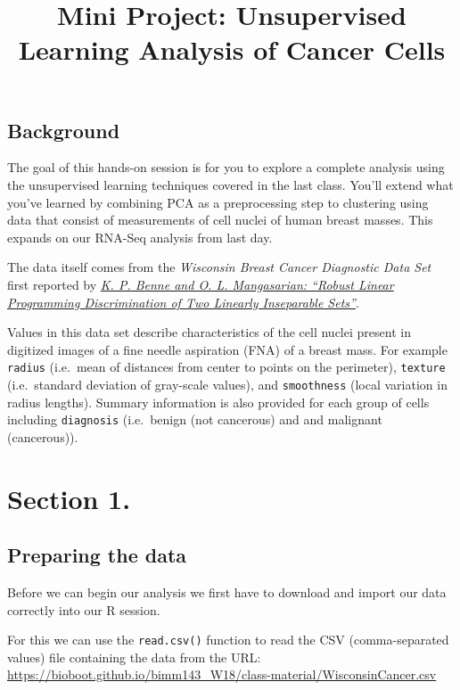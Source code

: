 \documentclass[]{article}
\title{Mini Project: Unsupervised Learning Analysis of Cancer Cells}
\author{}
\date{}
\begin{document}
\maketitle

\subsection{Background}\label{background}

The goal of this hands-on session is for you to explore a complete
analysis using the unsupervised learning techniques covered in the last
class. You'll extend what you've learned by combining PCA as a
preprocessing step to clustering using data that consist of measurements
of cell nuclei of human breast masses. This expands on our RNA-Seq
analysis from last day.

The data itself comes from the \emph{Wisconsin Breast Cancer Diagnostic
Data Set} first reported by
\href{http://archive.ics.uci.edu/ml/datasets/Breast+Cancer+Wisconsin+\%2528Diagnostic\%2529}{\emph{K.
P. Benne and O. L. Mangasarian: ``Robust Linear Programming
Discrimination of Two Linearly Inseparable Sets''}}.

Values in this data set describe characteristics of the cell nuclei
present in digitized images of a fine needle aspiration (FNA) of a
breast mass. For example \texttt{radius} (i.e.~mean of distances from
center to points on the perimeter), \texttt{texture} (i.e.~standard
deviation of gray-scale values), and \texttt{smoothness} (local
variation in radius lengths). Summary information is also provided for
each group of cells including \texttt{diagnosis} (i.e.~benign (not
cancerous) and and malignant (cancerous)).

\section{Section 1.}\label{section-1.}

\subsection{Preparing the data}\label{preparing-the-data}

Before we can begin our analysis we first have to download and import
our data correctly into our R session.

For this we can use the \texttt{read.csv()} function to read the CSV
(comma-separated values) file containing the data from the URL:
\url{https://bioboot.github.io/bimm143_W18/class-material/WisconsinCancer.csv}
\end{document}
